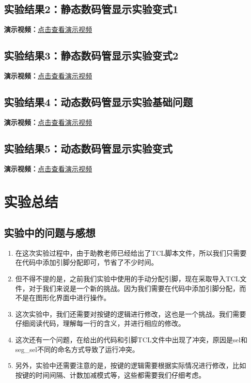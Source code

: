 \documentclass[UTF8]{article}
\theoremstyle{MyLineTheoremStyle} %
\theoremstyle{MyBlockTheoremStyle} %
\theoremstyle{MySubsubsectionStyle} %
\begin{document}
\subsection{实验结果2：静态数码管显示实验变式1}
\noindent
\textbf{演示视频：}\href{https://www.bilibili.com/video/BV1zJVRzNEHS?vd_source=4fd6c4265e65c0785c912874692a3971}{点击查看演示视频}

\subsection{实验结果3：静态数码管显示实验变式2}
\noindent
\textbf{演示视频：}\href{https://www.bilibili.com/video/BV1t6VRzDEVM?vd_source=4fd6c4265e65c0785c912874692a3971}{点击查看演示视频}

\subsection{实验结果4：动态数码管显示实验基础问题}
\noindent
\textbf{演示视频：}\href{https://www.bilibili.com/video/BV1u6VRzQE7A?vd_source=4fd6c4265e65c0785c912874692a3971}{点击查看演示视频}

\subsection{实验结果5：动态数码管显示实验变式}
\noindent
\textbf{演示视频：}\href{https://www.bilibili.com/video/BV1t6VRzDEs3?vd_source=4fd6c4265e65c0785c912874692a3971}{点击查看演示视频}

\section{实验总结}

\subsection{实验中的问题与感想}

\begin{enumerate}
\item 在这次实验过程中，由于助教老师已经给出了TCL脚本文件，所以我们只需要在代码中添加引脚分配即可，节省了不少时间。
\item 但不得不提的是，之前我们实验中使用的手动分配引脚，现在采取导入TCL文件，对于我们来说是一个新的挑战。因为我们需要在代码中添加引脚分配，而不是在图形化界面中进行操作。
\item 这次实验中，我们还需要对按键的逻辑进行修改，这也是一个挑战。我们需要仔细阅读代码，理解每一行的含义，并进行相应的修改。
\item 这次还有一个问题，在给出的代码和引脚TCL文件中出现了冲突，原因是sel和seg\_sel不同的命名方式导致了运行冲突。
\item 另外，实验中还需要注意的是，按键的逻辑需要根据实际情况进行修改，比如按键的时间间隔、计数加减模式等，这些都需要我们仔细考虑。
\end{enumerate}
\end{document}

